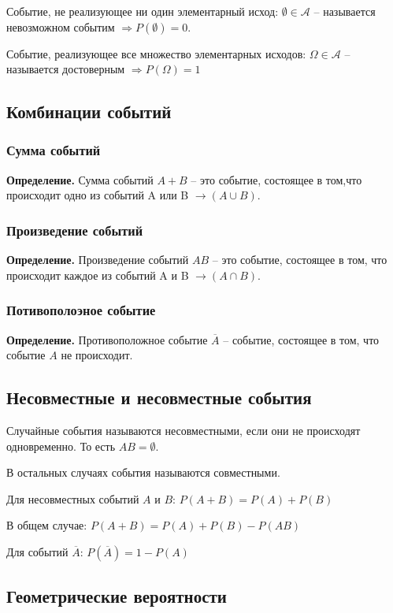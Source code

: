 \documentclass{article}
\begin{document}
Событие, не реализующее ни один элементарный исход: $\emptyset \in \mathcal{A} $ -- называется невозможном событим $\Rightarrow P(\emptyset) = 0$.

Событие, реализующее все множество элементарных исходов: $\Omega \in \mathcal{A}  $ -- называется достоверным $\Rightarrow P(\Omega) = 1$

\subsection{Комбинации событий}
\subsubsection{Сумма событий}

\textbf{Определение.} Сумма событий $ A + B $ -- это событие, состоящее в том,что происходит одно из событий A или B $\rightarrow (A\cup B) $.
\subsubsection{Произведение событий}

\textbf{Определение.} Произведение событий $AB$ -- это событие, состоящее в том, что происходит каждое из событий A и B $\rightarrow(A\cap B)$.

\subsubsection{Потивополоэное событие}

\textbf{Определение.} Противоположное событие $\overline A$ -- событие, состоящее в том, что событие $A$ не происходит.

\subsection{Несовместные и несовместные события}

Случайные события называются несовместными, если они не происходят одновременно. То есть $AB = \emptyset$.

В остальных случаях события называются совместными.

\quad

Для несовместных событий $A$ и $B$: $P(A + B) = P(A) + P(B)$

В общем случае: $P(A + B) = P(A) + P(B) - P(AB) $

Для событий $\overline A$: $P(\overline A) = 1 - P(A)$

\subsection{Геометрические вероятности}
\end{document}
